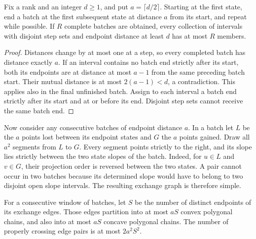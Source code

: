 \begin{lemma}\label{lem:greedy-batches}
Fix a rank and an integer $d\ge1$, and put $a=\lceil d/2\rceil$.
Starting at the first state, end a batch at the first subsequent state
at distance $a$ from its start, and repeat while possible.  If $R$
complete batches are obtained, every collection of intervals with
disjoint step sets and endpoint distance at least $d$ has at most
$R$ members.
\end{lemma}

\begin{proof}
Distances change by at most one at a step, so every completed batch has
distance exactly $a$.  If an interval contains no batch end strictly
after its start, both its endpoints are at distance at most $a-1$
from the same preceding batch start.  Their mutual distance is at most
$2(a-1)<d$, a contradiction.  This applies also in the final unfinished
batch.  Assign to each interval a batch end strictly after its start
and at or before its end.  Disjoint step sets cannot receive the same
batch end.
\end{proof}

Now consider any consecutive batches of endpoint distance $a$.  In a
batch let $L$ be the $a$ points lost between its endpoint states and
$G$ the $a$ points gained.  Draw all $a^2$ segments from $L$ to $G$.
Every segment points strictly to the right, and its slope lies
strictly between the two state slopes of the batch.  Indeed, for
$u\in L$ and $v\in G$, their projection order is reversed between
the two states.  A pair cannot occur in two batches because its
determined slope would have to belong to two disjoint open slope
intervals.  The resulting exchange graph is therefore simple.

\begin{lemma}\label{lem:chain-partitions}
For a consecutive window of batches, let $S$ be the number of distinct
endpoints of its exchange edges.  Those edges partition into at most
$aS$ convex polygonal chains, and also into at most $aS$ concave
polygonal chains.  The number of properly crossing edge pairs is at
most $2a^2S^2$.
\end{lemma}


